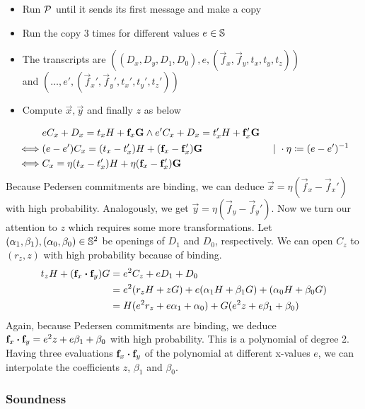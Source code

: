 \begin{itemize}
    \item Run $\mathcal{P}$ until it sends its first message and make a copy
    \item Run the copy 3 times for different values $e \in \mathbb{S}$
    \item The transcripts are $((D_x, D_y, D_1, D_0), e, (\vec{f}_x, \vec{f}_y, t_x, t_y, t_z))$ \\
    and $(\ldots, e', (\vec{f}_x', \vec{f}_y', t_x', t_y', t_z'))$
    \item Compute $\vec{x}, \vec{y}$ and finally $z$ as below
\end{itemize}
%
\begin{align*}
    &eC_x + D_x = t_xH + \mathbf{f}_x\mathbf{G} \land e'C_x + D_x = t_x'H + \mathbf{f}_x'\mathbf{G} \\
    \iff&(e - e')C_x = (t_x - t_x')H + (\mathbf{f}_x - \mathbf{f}_x')\mathbf{G} & \ |\  \cdot \eta \coloneqq (e - e')^{-1} \\
    \iff&C_x = \eta(t_x - t_x')H + \eta(\mathbf{f}_x - \mathbf{f}_x')\mathbf{G}
\end{align*}
%
Because Pedersen commitments are binding,
we can deduce $\vec{x} = \eta(\vec{f}_x - \vec{f}_x')$ with high probability.
Analogously, we get $\vec{y} = \eta(\vec{f}_y - \vec{f}_y')$.
%
Now we turn our attention to $z$ which requires some more transformations.
%
Let $(\alpha_1, \beta_1), (\alpha_0, \beta_0) \in \mathbb{S}^2$ be openings of $D_1$ and $D_0$, respectively.
We can open $C_z$ to $(r_z, z)$ with high probability because of binding.
%
\begin{align*}
    t_zH + (\mathbf{f}_x \boldsymbol{\cdot} \mathbf{f}_y)G
    &= e^2 C_z + eD_1 + D_0 \\
    &= e^2 (r_zH + zG) + e(\alpha_1H + \beta_1G) + (\alpha_0H + \beta_0G) \\
    &= H(e^2 r_z + e\alpha_1 + \alpha_0) + G(e^2 z + e\beta_1 + \beta_0)
\end{align*}
%
Again,
because Pedersen commitments are binding,
we deduce $\mathbf{f}_x \boldsymbol{\cdot} \mathbf{f}_y = e^2 z + e\beta_1 + \beta_0$ with high probability.
%
This is a polynomial of degree 2.
Having three evaluations $\mathbf{f}_x \boldsymbol{\cdot} \mathbf{f}_y$ of the polynomial at different x-values $e$,
we can interpolate the coefficients $z$, $\beta_1$ and $\beta_0$.

\subsubsection{Soundness}

